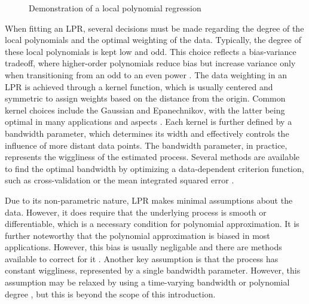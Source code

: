 \documentclass[man, floatsintext]{apa7}
\begin{document}
\begin{figure}[!ht]
  \caption{Demonstration of a local polynomial regression}
  \label{fig:locpol_dem}
\end{figure}

When fitting an LPR, several decisions must be
made regarding the degree of the local polynomials and the optimal weighting of
the data. Typically, the degree of these local polynomials is kept low and odd.
This choice reflects a bias-variance tradeoff, where higher-order polynomials
reduce bias but increase variance only when transitioning from an odd
to an even power \parencite{ruppert_multivariate_1994}. The data weighting
in an LPR is achieved through a
kernel function, which is usually centered and symmetric to assign weights
based
on the distance from the origin. Common kernel choices include the Gaussian and
Epanechnikov, with the latter being optimal in many applications and
aspects \parencite{fan_local_1997}. Each kernel is further defined by a
bandwidth parameter, which determines its width and effectively controls the
influence of more distant data points. The bandwidth parameter, in practice,
represents the wiggliness of the estimated process.
Several methods are available to find the optimal bandwidth by optimizing a
data-dependent criterion function, such as cross-validation or the mean
integrated squared error \parencite{kohler_review_2014, debruyne_model_2008}.

Due to its non-parametric nature, LPR makes minimal assumptions about the data.
However, it does require that the underlying process is smooth or
differentiable, which is a necessary condition for polynomial approximation.
It is further noteworthy that the polynomial approximation is biased in
most applications. However, this bias is usually negligable and there are
methods available to correct for it \parencite{R-nprobust}.
Another key assumption is that the process has constant
wiggliness, represented by a single bandwidth parameter. However,
this assumption may be relaxed by using a time-varying bandwidth
\parencite{fan_data-driven_1995} or
polynomial degree \parencite{fan_adaptive_1995}, but this is beyond the scope
of this introduction.
\end{document}
